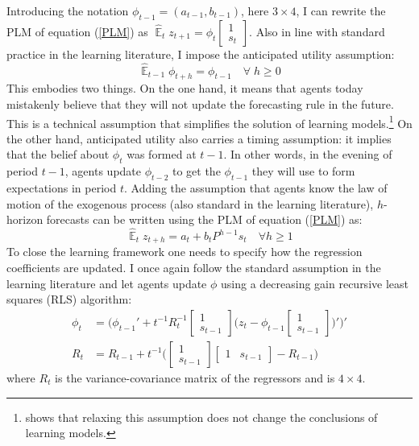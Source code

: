 \documentclass[11pt]{article}
\renewcommand{\[}{\begin{equation}}
\renewcommand{\]}{\end{equation}}
\DeclareMathOperator{\E}{\mathbb{E}}
\begin{document}
Introducing the notation $\phi_{t-1} = (a_{t-1}, b_{t-1})$, here $3\times 4$, I can rewrite the PLM of equation (\ref{PLM}) as $\hat{\E}_t z_{t+1} = \phi_{t}\begin{bmatrix} 1 \\ s_{t} \end{bmatrix} $. Also in line with standard practice in the learning literature, I impose the anticipated utility assumption:
\begin{equation}
\hat{\E}_{t-1}{\phi_{t+h}} = \phi_{t-1} \quad \forall \; h\geq0 
\end{equation}
This embodies two things. On the one hand, it means that agents today mistakenly believe that they will not update the forecasting rule in the future. This is a technical assumption that simplifies the solution of learning models.\footnote{\cite{sargent1999} shows that relaxing this assumption does not change the conclusions of learning models.} On the other hand, anticipated utility also carries a timing assumption: it implies that the belief about $\phi_t$ was formed at $t-1$. In other words, in the evening of period $t-1$, agents update $\phi_{t-2}$ to get the $\phi_{t-1}$ they will use to form expectations in period $t$.
Adding the assumption that agents know the law of motion of the exogenous process (also standard in the learning literature), $h$-horizon forecasts can be written using the PLM of equation (\ref{PLM}) as:
\begin{equation}
\hat{\E}_t z_{t+h} = a_{t} + b_{t}P^{h-1}s_t  \quad \forall h\geq 1 \label{PLM_fcst_general}
\end{equation}
To close the learning framework one needs to specify how the regression coefficients are updated. I once again follow the standard assumption in the learning literature and let agents update $\phi$ using a decreasing gain recursive least squares (RLS) algorithm:
\begin{align}
\phi_t  & = \bigg( \phi_{t-1}' + t^{-1} R_t^{-1}\begin{bmatrix} 1 \\ s_{t-1} \end{bmatrix}\bigg(z_{t} - \phi_{t-1} \begin{bmatrix} 1 \\ s_{t-1} \end{bmatrix} \bigg)' \bigg)' \\
R_t &= R_{t-1} +  t^{-1} \bigg( \begin{bmatrix} 1 \\ s_{t-1} \end{bmatrix} \begin{bmatrix} 1 & s_{t-1} \end{bmatrix}  - R_{t-1} \bigg)
\end{align}
where $R_t$ is the variance-covariance matrix of the regressors and is $4\times 4$.
\end{document}
